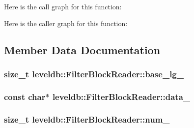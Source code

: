 Here is the call graph for this function\-:




Here is the caller graph for this function\-:




\subsection{Member Data Documentation}
\hypertarget{classleveldb_1_1_filter_block_reader_a973563cd3780b9be717a8b60096ed232}{
\subsubsection[{base\-\_\-lg\-\_\-}]{\setlength{\rightskip}{0pt plus 5cm}size\-\_\-t leveldb\-::\-Filter\-Block\-Reader\-::base\-\_\-lg\-\_\-\hspace{0.3cm}{\ttfamily [private]}}}\label{classleveldb_1_1_filter_block_reader_a973563cd3780b9be717a8b60096ed232}
\hypertarget{classleveldb_1_1_filter_block_reader_a8bbb336aa6b2a278e276aae0420e9376}{
\subsubsection[{data\-\_\-}]{\setlength{\rightskip}{0pt plus 5cm}const char$\ast$ leveldb\-::\-Filter\-Block\-Reader\-::data\-\_\-\hspace{0.3cm}{\ttfamily [private]}}}\label{classleveldb_1_1_filter_block_reader_a8bbb336aa6b2a278e276aae0420e9376}
\hypertarget{classleveldb_1_1_filter_block_reader_a6805c65b69099abe85ec0863bdaf9842}{
\subsubsection[{num\-\_\-}]{\setlength{\rightskip}{0pt plus 5cm}size\-\_\-t leveldb\-::\-Filter\-Block\-Reader\-::num\-\_\-\hspace{0.3cm}{\ttfamily [private]}}}\label{classleveldb_1_1_filter_block_reader_a6805c65b69099abe85ec0863bdaf9842}
